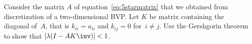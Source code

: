   Consider the matrix $A$ of equation~\eqref{eq:5starmatrix} that we
  obtained from discretization of a two-dimensional \ac{BVP}. Let $K$
  be matrix containing the diagonal of~$A$, that is $k_{ii}=a_{ii}$
  and $k_{ij}=0$ for~$i\not=j$. Use the Gershgorin theorem to show
  that $|\lambda(I-AK\inv)|<1$.
